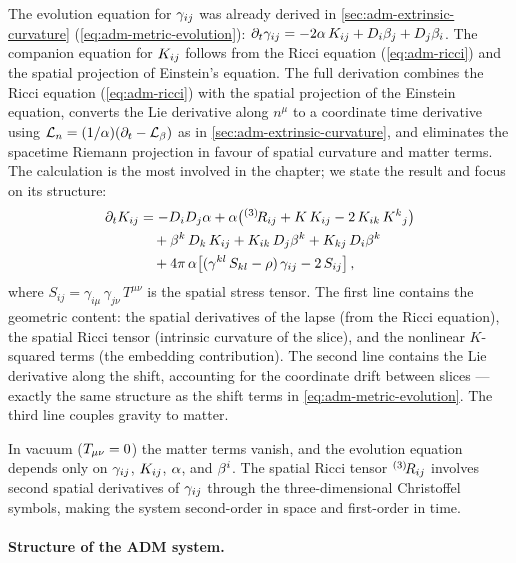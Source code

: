 The evolution equation for $\gamma_{ij}$ was already derived in
\cref{sec:adm-extrinsic-curvature} (\cref{eq:adm-metric-evolution}):
$\partial_t\gamma_{ij} = -2\alpha\,K_{ij} + D_i\beta_j + D_j\beta_i$.
The companion equation for $K_{ij}$ follows from the Ricci equation
(\cref{eq:adm-ricci}) and the spatial projection of Einstein's equation.
The full derivation combines the Ricci equation (\cref{eq:adm-ricci}) with
the spatial projection of the Einstein equation, converts the Lie
derivative along $n^\mu$ to a coordinate time derivative using
$\mathcal{L}_{n} = (1/\alpha)(\partial_t - \mathcal{L}_{\beta})$ as in
\cref{sec:adm-extrinsic-curvature}, and eliminates the spacetime Riemann
projection in favour of spatial curvature and matter terms.  The
calculation is the most involved in the chapter; we state the result and
focus on its structure:
%
\begin{equation}
  \begin{split}
  \partial_t K_{ij}
  &= -D_i D_j \alpha
     + \alpha\bigl({}^{(3)}\!R_{ij}
       + K\,K_{ij} - 2\,K_{ik}\,K^k{}_j\bigr) \\
  &\quad + \beta^k\,D_k\,K_{ij}
     + K_{ik}\,D_j\beta^k + K_{kj}\,D_i\beta^k \\
  &\quad + 4\pi\,\alpha\bigl[
       (\gamma^{kl}\,S_{kl} - \rho)\,\gamma_{ij} - 2\,S_{ij}\bigr] \,,
  \end{split}
  \label{eq:adm-kij-evolution}
\end{equation}
%
where $S_{ij} = \gamma_{i\mu}\,\gamma_{j\nu}\,T^{\mu\nu}$ is the spatial
stress tensor.  The first line contains the geometric content: the spatial
derivatives of the lapse (from the Ricci equation), the spatial Ricci
tensor (intrinsic curvature of the slice), and the nonlinear $K$-squared
terms (the embedding contribution).  The second line contains the Lie
derivative along the shift, accounting for the coordinate drift between
slices --- exactly the same structure as the shift terms in
\cref{eq:adm-metric-evolution}.  The third line couples gravity to matter.

In vacuum ($T_{\mu\nu} = 0$) the matter terms vanish, and the evolution
equation depends only on $\gamma_{ij}$, $K_{ij}$, $\alpha$, and
$\beta^{i}$.  The spatial Ricci tensor ${}^{(3)}\!R_{ij}$ involves second spatial
derivatives of $\gamma_{ij}$ through the three-dimensional Christoffel
symbols, making the system second-order in space and first-order in time.

\paragraph{Structure of the ADM system.}

